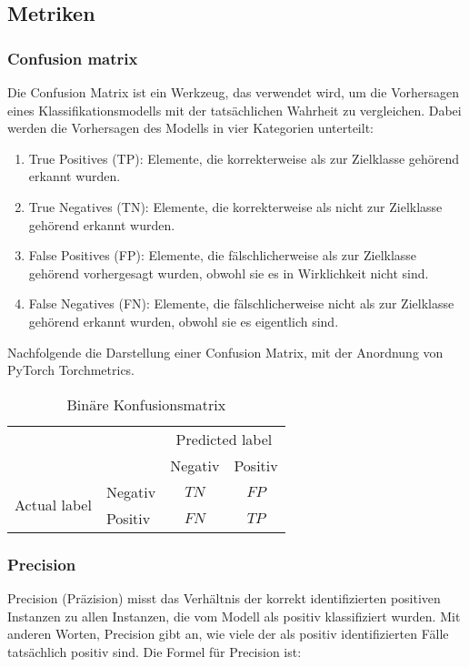 \subsection{Metriken}

\subsubsection{Confusion matrix}

Die Confusion Matrix ist ein Werkzeug, das verwendet wird, um die Vorhersagen eines Klassifikationsmodells mit der tatsächlichen Wahrheit zu vergleichen. Dabei werden die Vorhersagen des Modells in vier Kategorien unterteilt:

\begin{enumerate}
    \item True Positives (TP): Elemente, die korrekterweise als zur Zielklasse gehörend erkannt wurden.
    \item True Negatives (TN): Elemente, die korrekterweise als nicht zur Zielklasse gehörend erkannt wurden.
    \item False Positives (FP): Elemente, die fälschlicherweise als zur Zielklasse gehörend vorhergesagt wurden, obwohl sie es in Wirklichkeit nicht sind.
    \item False Negatives (FN): Elemente, die fälschlicherweise nicht als zur Zielklasse gehörend erkannt wurden, obwohl sie es eigentlich sind.
\end{enumerate}

Nachfolgende die Darstellung einer Confusion Matrix, mit der Anordnung von PyTorch Torchmetrics. 

\begin{table}[h]
    \centering
    \begin{tabular}{l|l|c|c|}
        \multicolumn{2}{c}{}&\multicolumn{2}{c}{Predicted label}\\
        \cline{3-4}
        \multicolumn{2}{c|}{}&Negativ&Positiv\\
        \cline{2-4}
        \multirow{2}{*}{Actual label}& Negativ & $TN$ & $FP$\\
        \cline{2-4}
        & Positiv & $FN$ & $TP$\\
        \cline{2-4}
    \end{tabular}
    \label{tab:conftable}
    \caption{Binäre Konfusionsmatrix}
\end{table}

\subsubsection{Precision}
Precision (Präzision) misst das Verhältnis der korrekt identifizierten positiven Instanzen zu allen Instanzen, die vom Modell als positiv klassifiziert wurden. Mit anderen Worten, Precision gibt an, wie viele der als positiv identifizierten Fälle tatsächlich positiv sind. Die Formel für Precision ist:

